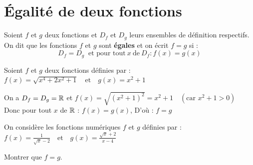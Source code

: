 \documentclass[10pt, a4paper]{article}
\begin{document}
\section{Égalité de deux fonctions }

\begin{Definition}[]
Soient $f$ et $g$ deux fonctions et $D_f$ et $D_g$ leurs ensembles de définition respectifs. \\
On dit que les fonctions $f$ et $g$ sont \textbf{égales } et on écrit $f = g$ si :
     $$D_f = D_g ~\text{ et pour tout}~  x ~\text{de}~ D_f : f(x) = g(x)$$
\end{Definition}

\begin{Exemple}[][10 min]
Soient $f$ et $g$ deux fonctions définies par :
 $f(x) = \sqrt{x^4 + 2x^2 + 1} \quad \text{et} \quad g(x) = x^2 + 1 $

\vspace{0.2cm}
On a $D_f = D_g = \mathbb{R}$ et
$f(x) = \sqrt{(x^2 + 1)^2} = x^2 + 1 \quad (\text{car } x^2 + 1 > 0)$ 
\vspace{0.2cm} \\
Donc pour tout $x$ de $\mathbb{R}$ :  $f(x) = g(x)$,
D'où : \quad $f = g$
\end{Exemple}

\begin{Application}[][30 min]
\noindent
On considère les fonctions numériques $f$ et $g$ définies par :
$f(x) = \frac{1}{\sqrt{x}-2} \quad \text{et} \quad g(x) = \frac{\sqrt{x}+2}{x-4}$

Montrer que $f=g$.
\end{Application}
\end{document}
